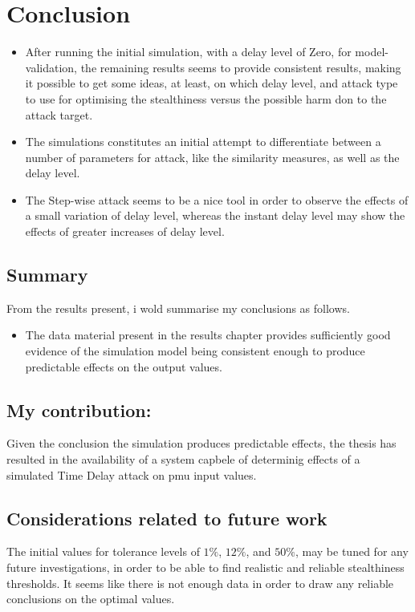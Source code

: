 \chapter{Conclusion}



\begin{itemize}
    \item  After running the initial simulation, with a delay level of Zero, for model-validation, the remaining results seems to provide consistent results, making it possible to get some ideas, at least, on which delay level, and attack type to use for optimising the stealthiness versus the possible harm don to the attack target.
    \item The simulations constitutes an initial attempt to differentiate between a number of parameters for attack, like the similarity measures, as well as the delay level. 
    \item The Step-wise attack seems to be a nice tool in order to observe the effects of a small variation of delay level, whereas the instant delay level may show the effects of greater increases of delay level. 
\end{itemize}





\section{Summary}
From the results present, i wold summarise my conclusions as follows.
\begin{itemize}
    \item The data material present in the results chapter provides sufficiently good evidence of the simulation model being consistent enough to produce predictable effects on the output values.

\end{itemize}


\section{My contribution:}
Given the conclusion the simulation produces predictable effects, the thesis has resulted in the availability of a system capbele of determinig effects of a simulated Time Delay attack on \acrshort{pmu} input values.

\section{Considerations related to future work}


The initial values for tolerance levels of $1\%$, $12\%$, and $50\%$, may be tuned for any future investigations, in order to be able to find realistic and reliable stealthiness thresholds. It seems like there is not enough  data in order to draw any reliable conclusions on the optimal values.
    



